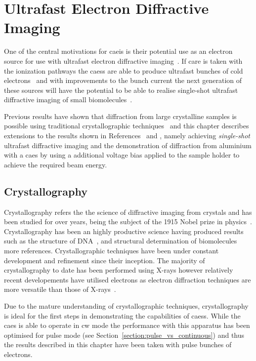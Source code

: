 \chapter{Ultrafast Electron Diffractive Imaging}\label{chapter:diffraction}

One of the central motivations for \gls{caeis} is their potential use as an electron source for use with ultrafast electron diffractive imaging~\cite{speirs_single-shot_2015,van_der_geer_ultracold_2009}.
If care is taken with the ionization pathways the \glspl{caes} are able to produce ultrafast bunches of cold electrons~\cite{speirs_single-shot_2015,speirs_identification_2017,speirs_electron_2017} and with improvements to the bunch current the next generation of these sources will have the potential to be able to realise single-shot ultrafast diffractive imaging of small biomolecules~\cite{mcculloch_cold_2016}.

Previous results have shown that diffraction from large crystalline samples is possible using traditional crystallographic techniques~\cite{speirs_single-shot_2015} and this chapter describes extensions to the results shown in References~\cite{speirs_single-shot_2015} and \cite{speirs_electron_2017}, namely achieving \emph{single-shot} ultrafast diffractive imaging and the demonstration of diffraction from aluminium with a \gls{caes} by using a additional voltage bias applied to the sample holder to achieve the required beam energy.

\section{Crystallography}

Crystallography refers the the science of diffractive imaging from crystals and has been studied for over \unit[100]{years}, being the subject of the 1915 Nobel prize in physics~\cite{bragg_structure_1913}.
Crystallography has been an highly productive science having produced results such as the structure of DNA~\cite{franklin_structure_1953,dennis_eternal_2003}, and structural determination of biomolecules~\cite{longchamp_how_2015} {\color{red} more references}.
Crystallographic techniques have been under constant development and refinement since their inception.
The majority of crystallography to date has been performed using X-rays however relatively recent developements have utilised electrons as electron diffraction techniques are more versatile than those of X-rays~\cite{cowley_electron_1992}.

Due to the mature understanding of crystallographic techniques, crystallography is ideal for the first steps in demonstrating the capabilities of \glspl{caes}.
While the \gls{caes} is able to operate in \gls{cw} mode the performance with this apparatus has been optimised for pulse mode (see Section~\ref{section:pulse_vs_continuous}) and thus the results described in this chapter have been taken with pulse bunches of electrons.

